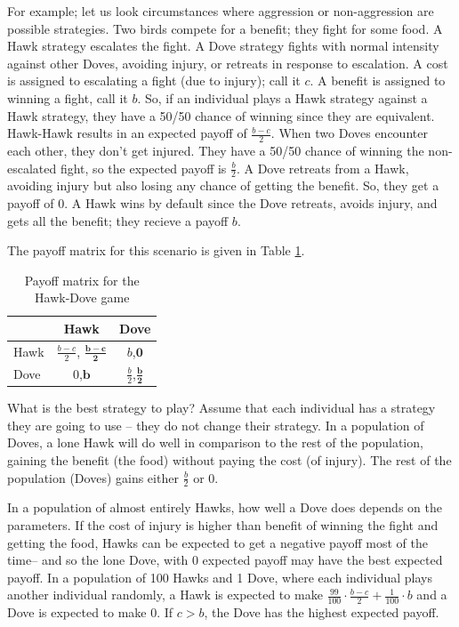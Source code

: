 \documentclass[a4paper,11pt,bcshonoursthesis,singlespace,oneside,thesisdraft,pdflatex]{cssethesis}
\begin{document}
For example; let us look circumstances where aggression or non-aggression are possible strategies. 
Two birds compete for a benefit; they fight for some food. 
A Hawk strategy escalates the fight. A Dove strategy fights with normal intensity against other Doves, avoiding injury, or retreats in response to escalation. 
A cost is assigned to escalating a fight (due to injury); call it $c$. 
A benefit is assigned to winning a fight, call it $b$. 
So, if an individual plays a Hawk strategy against a Hawk strategy, they have a 50/50 chance of winning since they are equivalent. Hawk-Hawk results in an expected payoff of $\frac{{b}-{c}}{2}$. 
When two Doves encounter each other, they don't get injured. 
They have a 50/50 chance of winning the non-escalated fight, so the expected payoff is $\frac{b}{2}$. 
A Dove retreats from a Hawk, avoiding injury but also losing any chance of getting the benefit. 
So, they get a payoff of $0$. A Hawk wins by default since the Dove retreats, avoids injury, and gets all the benefit; they recieve a payoff $b$. 

The payoff matrix for this scenario is given in Table \ref{table:payoffHD}.
\begin{table}[h]\centering
\captionsetup{justification=centering}
\begin{tabular}{|l|c|c|}
\hline
 & \bf{Hawk} & \bf{Dove}\\
\hline
Hawk & $\frac{{b}-{c}}{2}$, {$\boldsymbol{\frac{{b}-{c}}{2}}$} & $b$,$\boldsymbol{0}$\\
\hline
Dove & $0$,$\boldsymbol{b}$ & $\frac{b}{2}$,$\boldsymbol{\frac{b}{2}}$ \\
\hline
\end{tabular}
\caption{Payoff matrix for the Hawk-Dove game}
\label{table:payoffHD}
\end{table}

What is the best strategy to play? 
Assume that each individual has a strategy they are going to use -- they do not change their strategy. 
In a population of Doves, a lone Hawk will do well in comparison to the rest of the population, gaining the benefit (the food) without paying the cost (of injury). 
The rest of the population (Doves) gains either $\frac{b}{2}$ or $0$. 

In a population of almost entirely Hawks, how well a Dove does depends on the parameters. 
If the cost of injury is higher than benefit of winning the fight and getting the food, Hawks can be expected to get a negative payoff most of the time-- and so the lone Dove, with $0$ expected payoff may have the best expected payoff. In a population of 100 Hawks and 1 Dove, where each individual plays another individual randomly, a Hawk is expected to make $\frac{99}{100}\cdot\frac{b-c}{2}+\frac{1}{100}\cdot b$ and a Dove is expected to make $0$. If $c>b$, the Dove has the highest expected payoff. 
\end{document}
